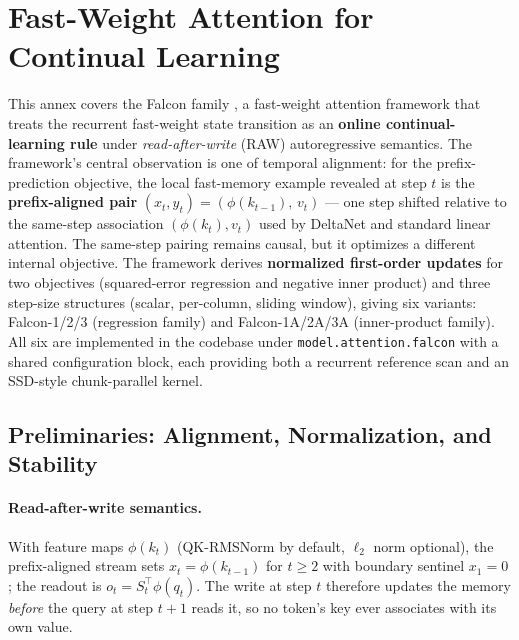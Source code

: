 \section{Fast-Weight Attention for Continual Learning}
\label{sec:annex-fast-weight}

This annex covers the Falcon family \citep{zhang_falcon_2026}, a fast-weight attention framework that treats the recurrent fast-weight state transition as an \textbf{online continual-learning rule} under \emph{read-after-write} (RAW) autoregressive semantics. The framework's central observation is one of temporal alignment: for the prefix-prediction objective, the local fast-memory example revealed at step $t$ is the \textbf{prefix-aligned pair} $(x_t, y_t) = (\phi(k_{t-1}),\, v_t)$ --- one step shifted relative to the same-step association $(\phi(k_t), v_t)$ used by DeltaNet and standard linear attention. The same-step pairing remains causal, but it optimizes a different internal objective. The framework derives \textbf{normalized first-order updates} for two objectives (squared-error regression and negative inner product) and three step-size structures (scalar, per-column, sliding window), giving six variants: Falcon-1/2/3 (regression family) and Falcon-1A/2A/3A (inner-product family). All six are implemented in the codebase under \texttt{model.attention.falcon} with a shared configuration block, each providing both a recurrent reference scan and an SSD-style chunk-parallel kernel.

\subsection{Preliminaries: Alignment, Normalization, and Stability}

\paragraph{Read-after-write semantics.} With feature maps $\phi(k_t)$ (QK-RMSNorm by default, $\ell_2$ norm optional), the prefix-aligned stream sets $x_t = \phi(k_{t-1})$ for $t \ge 2$ with boundary sentinel $x_1 = 0$; the readout is $o_t = S_t^\top \phi(q_t)$. The write at step $t$ therefore updates the memory \emph{before} the query at step $t+1$ reads it, so no token's key ever associates with its own value.


